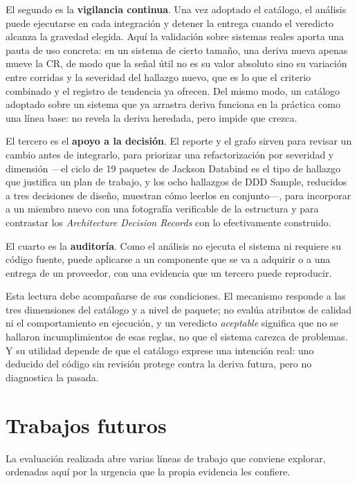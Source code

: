 El segundo es la \textbf{vigilancia continua}. Una vez adoptado el catálogo, el análisis puede ejecutarse en cada integración y detener la entrega cuando el veredicto alcanza la gravedad elegida. Aquí la validación sobre sistemas reales aporta una pauta de uso concreta: en un sistema de cierto tamaño, una deriva nueva apenas mueve la CR, de modo que la señal útil no es su valor absoluto sino su variación entre corridas y la severidad del hallazgo nuevo, que es lo que el criterio combinado y el registro de tendencia ya ofrecen. Del mismo modo, un catálogo adoptado sobre un sistema que ya arrastra deriva funciona en la práctica como una línea base: no revela la deriva heredada, pero impide que crezca.

El tercero es el \textbf{apoyo a la decisión}. El reporte y el grafo sirven para revisar un cambio antes de integrarlo, para priorizar una refactorización por severidad y dimensión ---el ciclo de 19 paquetes de Jackson Databind es el tipo de hallazgo que justifica un plan de trabajo, y los ocho hallazgos de DDD Sample, reducidos a tres decisiones de diseño, muestran cómo leerlos en conjunto---, para incorporar a un miembro nuevo con una fotografía verificable de la estructura y para contrastar los \textit{Architecture Decision Records} con lo efectivamente construido.

El cuarto es la \textbf{auditoría}. Como el análisis no ejecuta el sistema ni requiere su código fuente, puede aplicarse a un componente que se va a adquirir o a una entrega de un proveedor, con una evidencia que un tercero puede reproducir.

Esta lectura debe acompañarse de sus condiciones. El mecanismo responde a las tres dimensiones del catálogo y a nivel de paquete; no evalúa atributos de calidad ni el comportamiento en ejecución, y un veredicto \textit{aceptable} significa que no se hallaron incumplimientos de esas reglas, no que el sistema carezca de problemas. Y su utilidad depende de que el catálogo exprese una intención real: uno deducido del código sin revisión protege contra la deriva futura, pero no diagnostica la pasada.

\section{Trabajos futuros}
La evaluación realizada abre varias líneas de trabajo que conviene explorar, ordenadas aquí por la urgencia que la propia evidencia les confiere.

